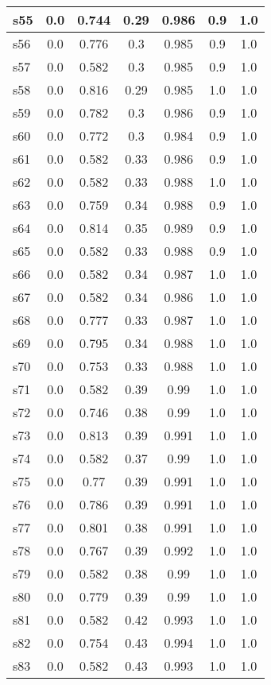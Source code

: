 \documentclass{article}
\begin{document}
\begin{tabular}{|l|c|c|c|c|c|c|}
s55 &0.0 & 0.744 & 0.29 & 0.986 & 0.9 & 1.0\\
\hline
s56 &0.0 & 0.776 & 0.3 & 0.985 & 0.9 & 1.0\\
\hline
s57 &0.0 & 0.582 & 0.3 & 0.985 & 0.9 & 1.0\\
\hline
s58 &0.0 & 0.816 & 0.29 & 0.985 & 1.0 & 1.0\\
\hline
s59 &0.0 & 0.782 & 0.3 & 0.986 & 0.9 & 1.0\\
\hline
s60 &0.0 & 0.772 & 0.3 & 0.984 & 0.9 & 1.0\\
\hline
s61 &0.0 & 0.582 & 0.33 & 0.986 & 0.9 & 1.0\\
\hline
s62 &0.0 & 0.582 & 0.33 & 0.988 & 1.0 & 1.0\\
\hline
s63 &0.0 & 0.759 & 0.34 & 0.988 & 0.9 & 1.0\\
\hline
s64 &0.0 & 0.814 & 0.35 & 0.989 & 0.9 & 1.0\\
\hline
s65 &0.0 & 0.582 & 0.33 & 0.988 & 0.9 & 1.0\\
\hline
s66 &0.0 & 0.582 & 0.34 & 0.987 & 1.0 & 1.0\\
\hline
s67 &0.0 & 0.582 & 0.34 & 0.986 & 1.0 & 1.0\\
\hline
s68 &0.0 & 0.777 & 0.33 & 0.987 & 1.0 & 1.0\\
\hline
s69 &0.0 & 0.795 & 0.34 & 0.988 & 1.0 & 1.0\\
\hline
s70 &0.0 & 0.753 & 0.33 & 0.988 & 1.0 & 1.0\\
\hline
s71 &0.0 & 0.582 & 0.39 & 0.99 & 1.0 & 1.0\\
\hline
s72 &0.0 & 0.746 & 0.38 & 0.99 & 1.0 & 1.0\\
\hline
s73 &0.0 & 0.813 & 0.39 & 0.991 & 1.0 & 1.0\\
\hline
s74 &0.0 & 0.582 & 0.37 & 0.99 & 1.0 & 1.0\\
\hline
s75 &0.0 & 0.77 & 0.39 & 0.991 & 1.0 & 1.0\\
\hline
s76 &0.0 & 0.786 & 0.39 & 0.991 & 1.0 & 1.0\\
\hline
s77 &0.0 & 0.801 & 0.38 & 0.991 & 1.0 & 1.0\\
\hline
s78 &0.0 & 0.767 & 0.39 & 0.992 & 1.0 & 1.0\\
\hline
s79 &0.0 & 0.582 & 0.38 & 0.99 & 1.0 & 1.0\\
\hline
s80 &0.0 & 0.779 & 0.39 & 0.99 & 1.0 & 1.0\\
\hline
s81 &0.0 & 0.582 & 0.42 & 0.993 & 1.0 & 1.0\\
\hline
s82 &0.0 & 0.754 & 0.43 & 0.994 & 1.0 & 1.0\\
\hline
s83 &0.0 & 0.582 & 0.43 & 0.993 & 1.0 & 1.0\\

\end{tabular}
\end{document}
